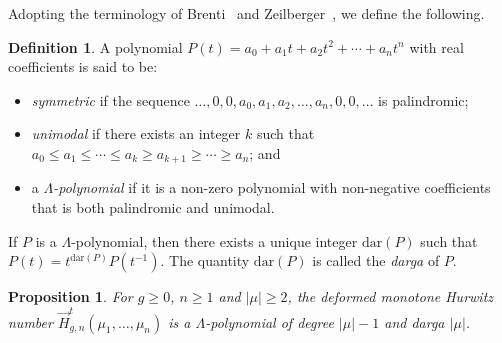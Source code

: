 \documentclass[a4paper]{article}
\theoremstyle{plain}
\newtheorem{proposition}[theorem]{Proposition}
\numberwithin{theorem}{section}
\theoremstyle{definition}
\newtheorem{definition}[theorem]{Definition}
\theoremstyle{remark}
\renewcommand{\leq}{\leqslant}
\renewcommand{\geq}{\geqslant}
\newcommand{\HN}[3]{\vec{H}^t_{#1,#2}(#3)}
\begin{document}
Adopting the terminology of Brenti~\cite{bre90} and Zeilberger~\cite{zei89}, we define the following.


\begin{definition}
A polynomial $P(t) = a_0 + a_1t + a_2t^2 + \cdots + a_nt^n$ with real coefficients is said to be:
\begin{itemize}
\item {\em symmetric} if the sequence $\ldots, 0, 0, a_0, a_1, a_2, \ldots, a_n, 0, 0, \ldots$ is palindromic;
\item {\em unimodal} if there exists an integer $k$ such that $a_0 \leq a_1 \leq \cdots \leq a_k \geq a_{k+1} \geq \cdots \geq a_n$; and
\item a {\em $\Lambda$-polynomial} if it is a non-zero polynomial with non-negative coefficients that is both palindromic and unimodal.
\end{itemize}
If $P$ is a $\Lambda$-polynomial, then there exists a unique integer $\mathrm{dar}(P)$ such that $P(t) = t^{\mathrm{dar}(P)} P(t^{-1})$. The quantity $\mathrm{dar}(P)$ is called the {\em darga} of $P$.
\end{definition}


\begin{proposition} \label{prop:symmetry}
For $g \geq 0$, $n \geq 1$ and $|\mu| \geq 2$, the deformed monotone Hurwitz number $\HN{g}{n}{\mu_1, \ldots, \mu_n}$ is a $\Lambda$-polynomial of degree $|\mu|-1$ and darga $|\mu|$.
\end{proposition}
\end{document}
